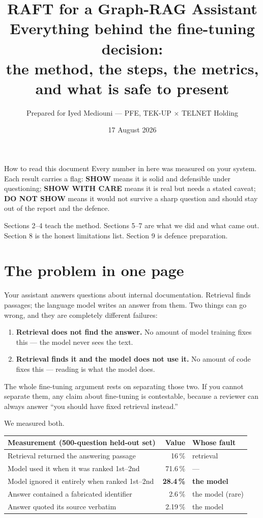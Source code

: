 \documentclass[11pt,a4paper]{article}
\title{\vspace{-1.6cm}\textbf{RAFT for a Graph-RAG Assistant}\\[0.25cm]
\large Everything behind the fine-tuning decision:\\the method, the steps, the metrics, and what is safe to present}
\author{Prepared for Iyed Mediouni --- PFE, TEK-UP $\times$ TELNET Holding}
\date{17 August 2026}
\newcommand{\SHOW}{\textcolor{good}{\textbf{SHOW}}}
\newcommand{\HIDE}{\textcolor{bad}{\textbf{DO NOT SHOW}}}
\newcommand{\CARE}{\textcolor{warn}{\textbf{SHOW WITH CARE}}}
\begin{document}
\maketitle
\thispagestyle{fancy}

\begin{keybox}{How to read this document}
Every number in here was measured on your system. Each result carries a flag:
\SHOW{} means it is solid and defensible under questioning; \CARE{} means it is real
but needs a stated caveat; \HIDE{} means it would not survive a sharp question and
should stay out of the report and the defence.

Sections 2--4 teach the method. Sections 5--7 are what we did and what came out.
Section 8 is the honest limitations list. Section 9 is defence preparation.
\end{keybox}

\tableofcontents
\newpage

\section{The problem in one page}

Your assistant answers questions about internal documentation. Retrieval finds
passages; the language model writes an answer from them. Two things can go wrong,
and they are completely different failures:

\begin{enumerate}[leftmargin=1.4em]
  \item \textbf{Retrieval does not find the answer.} No amount of model training
        fixes this --- the model never sees the text.
  \item \textbf{Retrieval finds it and the model does not use it.} No amount of
        code fixes this --- reading is what the model does.
\end{enumerate}

The whole fine-tuning argument rests on separating those two. If you cannot
separate them, any claim about fine-tuning is contestable, because a reviewer can
always answer ``you should have fixed retrieval instead.''

We measured both.

\begin{table}[h]\centering\small
\begin{tabularx}{\textwidth}{Y r l}
\toprule
\textbf{Measurement (500-question held-out set)} & \textbf{Value} & \textbf{Whose fault} \\
\midrule
Retrieval returned the answering passage & 16\,\% & retrieval \\
 Model used it when it was ranked 1st--2nd & 71.6\,\% & --- \\
Model ignored it entirely when ranked 1st--2nd & \textbf{28.4\,\%} & \textbf{the model} \\
 Answer contained a fabricated identifier & 2.6\,\% & the model (rare) \\
Answer quoted its source verbatim & 2.19\,\% & the model \\
\bottomrule
\end{tabularx}
\end{table}
\end{document}
